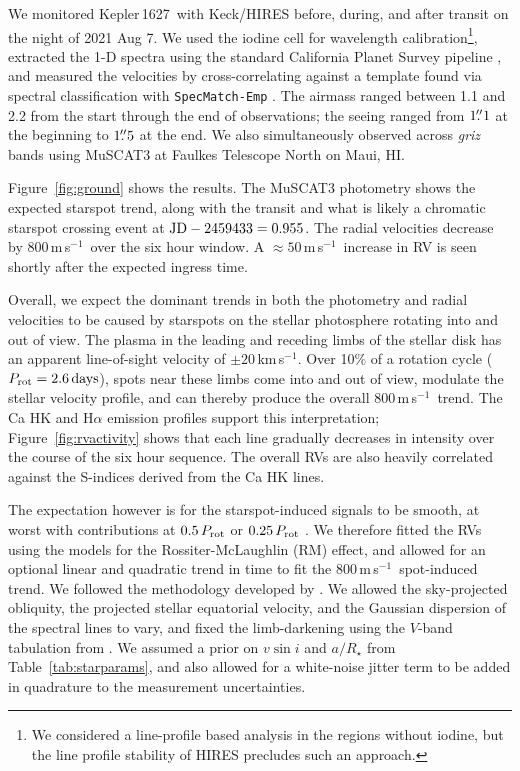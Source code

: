 \documentclass[12pt,modern,twocolumn,tighten]{aastex63}
\newcommand{\sn}{Kepler\,1627} %
\newcommand{\kms}{\,km\,s$^{-1}$}
\newcommand{\ms}{\,m\,s$^{-1}$}
\begin{document}
We monitored \sn\ with Keck/HIRES before, during, and after transit on
the night of 2021 Aug 7.  We used the iodine cell for wavelength
calibration\footnote{We considered a line-profile based analysis in
the regions without iodine, but the line profile stability of HIRES
precludes such an approach.}, extracted the 1-D spectra using the
standard California Planet Survey pipeline \citep{howard_cps_2010},
and measured the velocities by cross-correlating against a template
found via spectral classification with \texttt{SpecMatch-Emp}
\citep{yee_SM_2017}.  The airmass ranged between 1.1 and 2.2 from the
start through the end of observations; the seeing ranged from
$1\mbox{$.\!\!^{\prime\prime}$}1$ at the beginning to $1\mbox{$.\!\!^{\prime\prime}$}5$ at the end.  We also
simultaneously observed across {\it griz} bands using MuSCAT3 at
Faulkes Telescope North on Maui, HI.

Figure~\ref{fig:ground} shows the results.  The
MuSCAT3 photometry shows the expected starspot trend, along with the
transit and what is likely a chromatic starspot crossing event at
${\rm JD} - 2459433 = 0.955$.  The radial velocities decrease by
800\ms\ over the six hour window.  A $\approx50$\ms\  increase in RV
is seen shortly after the expected ingress time. 

Overall, we expect the dominant trends in both the photometry and
radial velocities to be caused by starspots on the stellar photosphere
rotating into and out of view.  The plasma in the leading and receding
limbs of the stellar disk has an apparent line-of-sight velocity of
$\pm 20$\kms.  Over 10\% of a rotation cycle ($P_{\rm
rot}=2.6\,{\rm days}$), spots near these limbs come into and out of
view, modulate the stellar velocity profile, and can thereby produce
the overall 800\ms\ trend.  The Ca HK and H$\alpha$ emission
profiles support this interpretation;
Figure~\ref{fig:rvactivity} shows that each line gradually decreases in
intensity over the course of the six hour sequence.
The overall RVs are also heavily correlated against the S-indices
derived from the Ca HK lines.

The expectation however is for the starspot-induced signals to be smooth,
at worst with contributions at $0.5\,P_{\rm rot}$ or $0.25\,P_{\rm
rot}$ \citep{klein_simulated_2020}.  We therefore fitted the RVs using
the \citet{hirano_analytic_2010,hirano_2011} models for the
Rossiter-McLaughlin (RM) effect, and allowed for an optional linear
and quadratic trend in time to fit the 800\ms\ spot-induced trend.  We
followed the methodology developed by \citet{stefansson_2020}.  We
allowed the sky-projected obliquity, the projected stellar equatorial
velocity, and the Gaussian dispersion of the spectral lines to vary,
and fixed the limb-darkening using the $V$-band tabulation from
\citet{claret_gravity_2011}.  We assumed a prior on $v\sin i$ and
$a/R_\star$ from Table~\ref{tab:starparams}, and also allowed for a
white-noise jitter term to be added in quadrature to the measurement
uncertainties.
\end{document}

